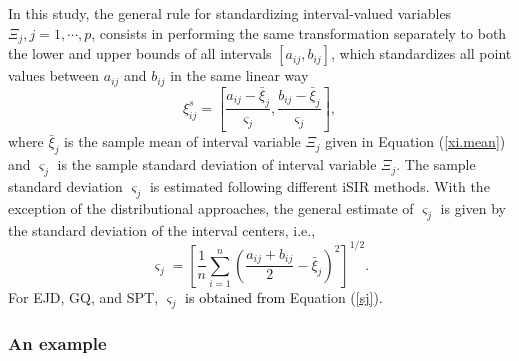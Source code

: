 \documentclass[article]{jss}
\begin{document}
In this study, the general rule for standardizing
interval-valued variables $\Xi_j, j=1,\cdots, p$, consists in
performing the same transformation separately to both the lower
and upper bounds of all intervals $[a_{ij}, b_{ij}]$, which 
standardizes all point values between $a_{ij}$ and $b_{ij}$ 
in the same linear way
\[
\xi_{ij}^s = \left[\frac{a_{ij}-\bar{\xi}_j}{\varsigma_j},
 \frac{b_{ij}-\bar{\xi}_j}{\varsigma_j}\right],
\]
where $\bar{\xi}_{j}$ is the sample mean of interval
variable $\Xi_j$ given in Equation (\ref{xi.mean}) and
$\varsigma_j$ is the sample standard deviation of interval
variable $\Xi_j$. The sample standard deviation
$\varsigma_j$ is estimated following different iSIR
methods. With the exception of the distributional approaches, the general estimate of
$\varsigma_j$ is given by the standard deviation of the 
interval centers, i.e.,
\[
 \varsigma_j=\left[\frac{1}{n}\sum_{i=1}^n\left(\frac{a_{ij}+b_{ij}}{2}-
\bar{\xi}_j\right)^2\right]^{1/2}.
\]
For EJD, GQ, and SPT,
$\varsigma_j$  
\textcolor{black}{is obtained from}
Equation (\ref{sj}). 


\subsubsection{An example}
\end{document}

